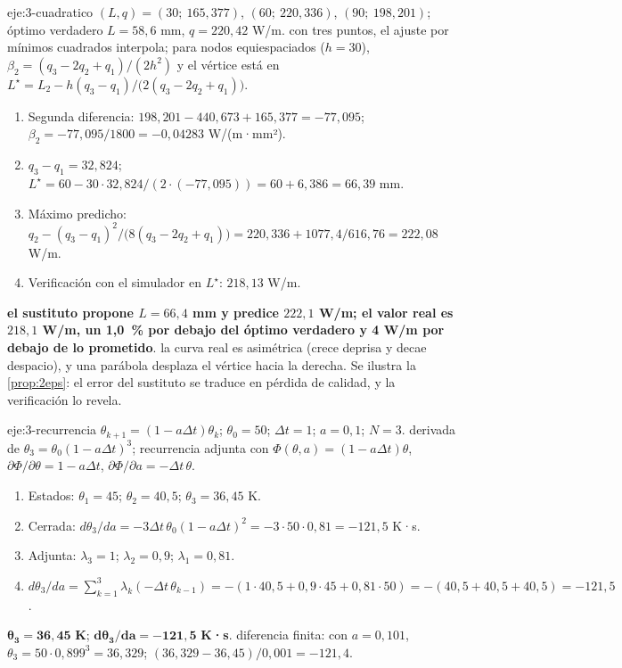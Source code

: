 \begin{solucion}{eje:3-cuadratico}
\datos $(L,q)=(30;\ 165{,}377)$, $(60;\ 220{,}336)$, $(90;\ 198{,}201)$; óptimo verdadero $L=58{,}6$ mm, $q=220{,}42$ W/m.
\planteamiento con tres puntos, el ajuste por mínimos cuadrados interpola; para nodos equiespaciados ($h=30$), $\beta_2=(q_3-2q_2+q_1)/(2h^2)$ y el vértice está en $L^\star=L_2-h(q_3-q_1)/\bigl(2(q_3-2q_2+q_1)\bigr)$.
\pasos
\begin{enumerate}[label=\arabic*.]
  \item Segunda diferencia: $198{,}201-440{,}673+165{,}377=-77{,}095$; $\beta_2=-77{,}095/1800=-0{,}04283$ W/(m·mm²).
  \item $q_3-q_1=32{,}824$; $L^\star=60-30\cdot 32{,}824/(2\cdot(-77{,}095))=60+6{,}386=66{,}39$ mm.
  \item Máximo predicho: $q_2-(q_3-q_1)^2/\bigl(8(q_3-2q_2+q_1)\bigr)=220{,}336+1077{,}4/616{,}76=222{,}08$ W/m.
  \item Verificación con el simulador en $L^\star$: $218{,}13$ W/m.
\end{enumerate}
\resultado \textbf{el sustituto propone $L=66{,}4$ mm y predice $222{,}1$ W/m; el valor real es $218{,}1$ W/m, un 1,0~\% por debajo del óptimo verdadero y 4 W/m por debajo de lo prometido}.
\comprobacion la curva real es asimétrica (crece deprisa y decae despacio), y una parábola desplaza el vértice hacia la derecha. Se ilustra la \cref{prop:2eps}: el error del sustituto se traduce en pérdida de calidad, y la verificación lo revela.
\end{solucion}

\begin{solucion}{eje:3-recurrencia}
\datos $\theta_{k+1}=(1-a\Delta t)\theta_k$; $\theta_0=50$; $\Delta t=1$; $a=0{,}1$; $N=3$.
\planteamiento derivada de $\theta_3=\theta_0(1-a\Delta t)^3$; recurrencia adjunta con $\Phi(\theta,a)=(1-a\Delta t)\theta$, $\partial\Phi/\partial\theta=1-a\Delta t$, $\partial\Phi/\partial a=-\Delta t\,\theta$.
\pasos
\begin{enumerate}[label=\arabic*.]
  \item Estados: $\theta_1=45$; $\theta_2=40{,}5$; $\theta_3=36{,}45$ K.
  \item Cerrada: $d\theta_3/da=-3\Delta t\,\theta_0(1-a\Delta t)^2=-3\cdot 50\cdot 0{,}81=-121{,}5$ K·s.
  \item Adjunta: $\lambda_3=1$; $\lambda_2=0{,}9$; $\lambda_1=0{,}81$.
  \item $d\theta_3/da=\sum_{k=1}^3\lambda_k(-\Delta t\,\theta_{k-1})=-(1\cdot 40{,}5+0{,}9\cdot 45+0{,}81\cdot 50)=-(40{,}5+40{,}5+40{,}5)=-121{,}5$.
\end{enumerate}
\resultado $\mathbf{\theta_3=36{,}45}$ \textbf{K}; $\mathbf{d\theta_3/da=-121{,}5}$ \textbf{K·s}.
\comprobacion diferencia finita: con $a=0{,}101$, $\theta_3=50\cdot 0{,}899^3=36{,}329$; $(36{,}329-36{,}45)/0{,}001=-121{,}4$.
\end{solucion}


